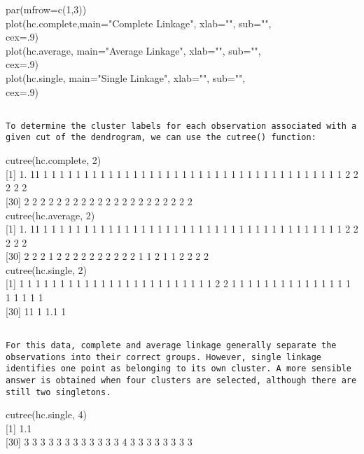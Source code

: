\documentclass[10pt]{article}
\begin{document}
\begin{displayquote}
par(mfrow=c(1,3))\\
plot(hc.complete,main="Complete Linkage", xlab="", sub="",\\
cex=.9)\\
plot(hc.average, main="Average Linkage", xlab="", sub="",\\
cex=.9)\\
plot(hc.single, main="Single Linkage", xlab="", sub="",\\
cex=.9)
\end{displayquote}

\begin{verbatim}

To determine the cluster labels for each observation associated with a given cut of the dendrogram, we can use the cutree() function:
\end{verbatim}

\begin{displayquote}
cutree(hc.complete, 2)\\[0pt]
[1] 1. 11 1 1 1 1 1 1 1 1 1 1 1 1 1 1 1 1 1 1 1 1 1 1 1 1 1 1 1 1 1 1 1 1 1 1 1 1 1 2 2 2 2 2\\[0pt]
[30] 2 2 2 2 2 2 2 2 2 2 2 2 2 2 2 2 2 2 2 2 2\\
cutree(hc.average, 2)\\[0pt]
[1] 1. 11 1 1 1 1 1 1 1 1 1 1 1 1 1 1 1 1 1 1 1 1 1 1 1 1 1 1 1 1 1 1 1 1 1 1 1 1 1 2 2 2 2 2\\[0pt]
[30] 2 2 2 1 2 2 2 2 2 2 2 2 2 2 1 1 2 1 1 2 2 2 2\\
cutree(hc.single, 2)\\[0pt]
[1] 1 1 1 1 1 1 1 1 1 1 1 1 1 1 1 1 1 1 1 1 1 1 1 1 2 2 1 1 1 1 1 1 1 1 1 1 1 1 1 1 1 1 1 1 1 1\\[0pt]
[30] 11 1 1.1 1
\end{displayquote}

\begin{verbatim}

For this data, complete and average linkage generally separate the observations into their correct groups. However, single linkage identifies one point as belonging to its own cluster. A more sensible answer is obtained when four clusters are selected, although there are still two singletons.
\end{verbatim}

\begin{displayquote}
cutree(hc.single, 4)\\[0pt]
[1] 1.1\\[0pt]
[30] 3 3 3 3 3 3 3 3 3 3 3 3 4 3 3 3 3 3 3 3 3
\end{displayquote}
\end{document}

